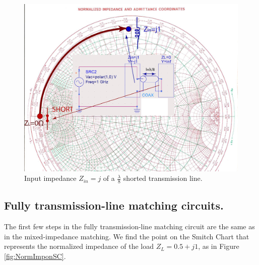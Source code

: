 \documentclass{ximera}
\begin{document}
\begin{figure}[htbp]
\begin{center}
\includegraphics[scale=0.4]{../jpg/shortedstub-01.jpg}
\end{center}
\caption{Input impedance $Z_{in}=j$ of a $\frac{\lambda}{8}$ shorted transmission line.}
\label{fig:ShortedStubLambdaOver8}
\end{figure}
\newpage

\subsection{Fully transmission-line matching circuits.}

The first few steps in the fully transmission-line matching circuit are the same as in the mixed-impedance matching. We find the point on the Smitch Chart that represents the normalized impedance of the load $Z_L=0.5+j1$, as in Figure \ref{fig:NormImponSC}. 
\end{document}
